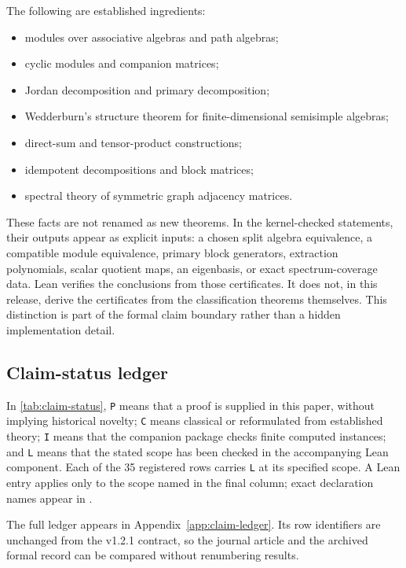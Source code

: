 \documentclass[11pt]{article}
\theoremstyle{definition}
\theoremstyle{remark}
\begin{document}
The following are established ingredients:
\begin{itemize}
\item modules over associative algebras and path algebras;
\item cyclic modules and companion matrices;
\item Jordan decomposition and primary decomposition;
\item Wedderburn's structure theorem for finite-dimensional semisimple algebras;
\item direct-sum and tensor-product constructions;
\item idempotent decompositions and block matrices;
\item spectral theory of symmetric graph adjacency matrices.
\end{itemize}

These facts are not renamed as new theorems. In the kernel-checked statements, their outputs appear as explicit inputs: a chosen split algebra equivalence, a compatible module equivalence, primary block generators, extraction polynomials, scalar quotient maps, an eigenbasis, or exact spectrum-coverage data. Lean verifies the conclusions from those certificates. It does not, in this release, derive the certificates from the classification theorems themselves. This distinction is part of the formal claim boundary rather than a hidden implementation detail.

\subsection{Claim-status ledger}

In \cref{tab:claim-status}, \texttt{P} means that a proof is supplied in this paper, without implying historical novelty; \texttt{C} means classical or reformulated from established theory; \texttt{I} means that the companion package checks finite computed instances; and \texttt{L} means that the stated scope has been checked in the accompanying Lean component. Each of the 35 registered rows carries \texttt{L} at its specified scope. A Lean entry applies only to the scope named in the final column; exact declaration names appear in .

The full ledger appears in Appendix~\ref{app:claim-ledger}. Its row
identifiers are unchanged from the v1.2.1 contract, so the journal article
and the archived formal record can be compared without renumbering results.
\end{document}

